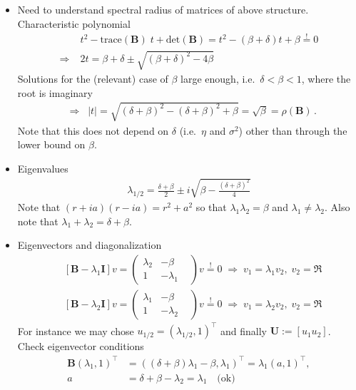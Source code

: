 \documentclass{article}
\newcommand{\mI}{{\mathbf I}}
\newcommand{\mB}{{\mathbf B}}
\newcommand{\mU}{{\mathbf U}}
\begin{document}
\begin{enumerate}
\begin{itemize}
\item Need to understand spectral radius of matrices  of above structure. Characteristic polynomial 
\begin{align}
& t^2 - \text{trace}(\mB) \; t+ \text{det}(\mB) = t^2 - (\beta+ \delta)  t + \beta \stackrel != 0 \\
\Longrightarrow\; & 2t = \beta+\delta \pm \sqrt{ (\beta + \delta)^2 -4\beta }
\end{align}
Solutions for the (relevant) case of $\beta$ large enough, i.e.~$\delta < \beta <1$, where the root is imaginary 
\begin{align}
\;\; \Longrightarrow \;\; |t| = \sqrt{ (\delta+\beta)^2 - (\delta + \beta)^2 + \beta} =  \sqrt \beta=\rho(\mB)\,.
\end{align}
Note that this does not depend on $\delta$ (i.e.~$\eta$ and $\sigma^2$) other than through the lower bound on $\beta$. 
\item Eigenvalues
\begin{align}
\lambda_{1/2}= \frac{\delta + \beta}{2} \pm i \sqrt{\beta - \frac{(\delta + \beta)^2}4}
\end{align}
Note that $(r+ia)(r-ia) = r^2 + a^2$ so that $\lambda_1 \lambda_2  = \beta$ and $\lambda_1 \neq \lambda_2$.  Also note that $\lambda_1 +\lambda_2 = \delta + \beta$. 
\item 
Eigenvectors and diagonalization 
\begin{align}
& [\mB - \lambda_{1} \mI] v = 
\begin{pmatrix} 
\lambda_{2} & -\beta \\ 1 & - \lambda_{1}&  
\end{pmatrix} v 
\stackrel != 0 \;  \Longrightarrow \;   v_1 = \lambda_{1} v_2,\;  v_2 = \Re\\
& [\mB - \lambda_{2} \mI] v = 
\begin{pmatrix} 
\lambda_{1} & -\beta \\ 1 & - \lambda_{2}&  
\end{pmatrix} v 
\stackrel != 0 \; \Longrightarrow \; v_1 = \lambda_{2} v_2, \; v_2 = \Re
\end{align}
For instance we may chose $u_{1/2} = (\lambda_{1/2}, 1)^\top$ and finally $\mU := [u_1 u_2]$. Check eigenvector conditions
\begin{align}
\mB (\lambda_1,1)^\top & = ((\delta+\beta)\lambda_1 - \beta, \lambda_1 )^\top = \lambda_1 (a,1)^\top, \\
a & = \delta + \beta - \lambda_2 = \lambda_1 \quad \text{(ok)}
\end{align}

\end{itemize}
\end{enumerate}
\end{document}
